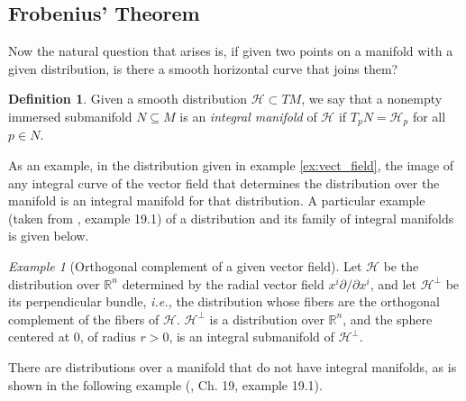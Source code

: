 \documentclass[12pt, letterpaper, reqno]{amsart}
\theoremstyle{definition}
\newtheorem{df}{Definition}
\theoremstyle{plain}
\theoremstyle{remark}
\newtheorem{ex}{Example}
\begin{document}
\subsection{Frobenius' Theorem}%
\label{sub:frobenius_theorem}


Now the natural question that arises is, if given two points on a manifold with a given distribution, is there a smooth horizontal curve that joins them? 

\begin{df}
	Given a smooth distribution $ \mathcal{H} \subset TM$, we say that a nonempty immersed submanifold $ N\subseteq M $  is an \textit{integral manifold} of $\mathcal{H}$ if $ T_p N = \mathcal{H}_p $ for all $ p\in N $.
\end{df}
 As an example, in the distribution given in example \ref{ex:vect_field}, the image of any integral curve of the vector field that determines the distribution over the manifold is an integral manifold for that distribution. A particular example (taken from \cite{lee2003introduction}, example 19.1) of a distribution and its family of integral manifolds is given below.

\begin{ex}[Orthogonal complement of a given vector field]
Let $ \mathcal{H} $ be the distribution over $ \mathbb{R}^n $ determined by the radial vector field $ x^i \partial / \partial x^i $, and let $ \mathcal{H}^\perp $ be its perpendicular bundle, \textit{i.e.,} the distribution whose fibers are the orthogonal complement of the fibers of $ \mathcal{H}. $ $ \mathcal{H}^\perp $ is a distribution over $ \mathbb{R}^n  $, and the sphere centered at $0$, of radius $r>0$, is an integral submanifold of $ \mathcal{H}^\perp. $        
\end{ex}

There are distributions over a manifold that do not have integral manifolds, as is shown in the following example (\cite{lee2003introduction}, Ch. 19, example 19.1).
\end{document}
